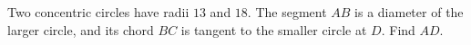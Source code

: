 Two concentric circles have radii $13$ and $18$. The segment $AB$ is a diameter of the larger circle, and its chord $BC$ is tangent to the smaller circle at $D$. Find $AD$.

